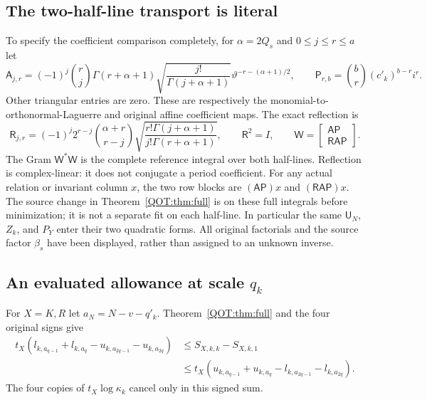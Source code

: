 \documentclass[11pt,a4paper]{article}
\begin{document}
\subsection{The two-half-line transport is literal}
To specify the coefficient comparison completely, for $\alpha=2Q_s$ and $0\le j\le r\le a$ let
\begin{equation}
 \mathsf A_{j,r}=(-1)^j\binom rj\Gamma(r+\alpha+1)
 \sqrt{\frac{j!}{\Gamma(j+\alpha+1)}}
 \vartheta^{-r-(\alpha+1)/2},\qquad
 \mathsf P_{r,b}=\binom br(c'_k)^{b-r}i^r .
 \label{QOT:eq:rowsAP}
\tag{QOT17}
\end{equation}
Other triangular entries are zero. These are respectively the monomial-to-orthonormal-Laguerre and original affine coefficient maps. The exact reflection is
\begin{equation}
 \mathsf R_{j,r}=(-1)^j2^{r-j}\binom{\alpha+r}{r-j}
  \sqrt{\frac{r!\Gamma(j+\alpha+1)}{j!\Gamma(r+\alpha+1)}},
 \qquad \mathsf R^2=I,
 \qquad \mathsf W=\begin{bmatrix}\mathsf A\mathsf P\\
                    \mathsf R\mathsf A\mathsf P\end{bmatrix}.
 \label{QOT:eq:W}
\tag{QOT18}
\end{equation}
The Gram $\mathsf W^*\mathsf W$ is the complete reference integral over both half-lines. Reflection is complex-linear: it does not conjugate a period coefficient. For any actual relation or invariant column $x$, the two row blocks are $(\mathsf A\mathsf P)x$ and $(\mathsf R\mathsf A\mathsf P)x$. The source change in Theorem~\ref{QOT:thm:full} is on these full integrals before minimization; it is not a separate fit on each half-line. In particular the same $\mathsf U_N$, $Z_k$, and $P_Y$ enter their two quadratic forms. All original factorials and the source factor $\beta_s$ have been displayed, rather than assigned to an unknown inverse.

\subsection{An evaluated allowance at scale $q_k$}
For $X=K,R$ let $a_N=N-v-q'_k$. Theorem~\ref{QOT:thm:full} and the four original signs give
\begin{equation}
\begin{split}
 t_X(l_{k,a_{q-1}}+l_{k,a_q}-u_{k,a_{2q-1}}-u_{k,a_{2q}})
 &\le S_{X,k,k}-S_{X,k,1}\\
 &\le t_X(u_{k,a_{q-1}}+u_{k,a_q}-l_{k,a_{2q-1}}-l_{k,a_{2q}}).
\end{split}\label{QOT:eq:allocationinterval}
\tag{QOT19}
\end{equation}
The four copies of $t_X\log\kappa_k$ cancel only in this signed sum.
\end{document}
